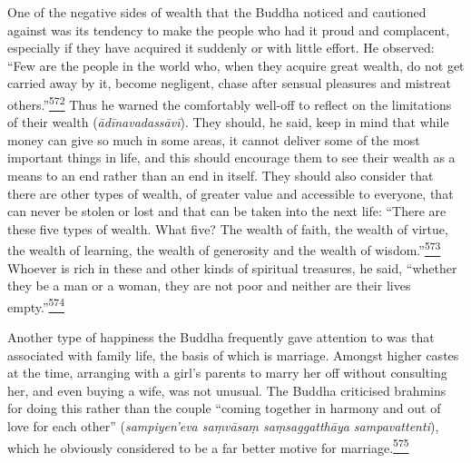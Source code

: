 One of the negative sides of wealth that the Buddha noticed and
cautioned against was its tendency to make the people who had it proud
and complacent, especially if they have acquired it suddenly or with
little effort. He observed: ``Few are the people in the world who, when
they acquire great wealth, do not get carried away by it, become
negligent, chase after sensual pleasures and mistreat
others.''\label{footprints_split_015.html_fnref572}\hyperref[footprints_split_025.htmlux5cux23fn572]{\textsuperscript{572}}
Thus he warned the comfortably well-off to reflect on the limitations of
their wealth (\emph{ādīnavadassāvī}). They should, he said, keep in mind
that while money can give so much in some areas, it cannot deliver some
of the most important things in life, and this should encourage them to
see their wealth as a means to an end rather than an end in itself. They
should also consider that there are other types of wealth, of greater
value and accessible to everyone, that can never be stolen or lost and
that can be taken into the next life: ``There are these five types of
wealth. What five? The wealth of faith, the wealth of virtue, the wealth
of learning, the wealth of generosity and the wealth of
wisdom.''\label{footprints_split_015.html_fnref573}\hyperref[footprints_split_025.htmlux5cux23fn573]{\textsuperscript{573}}
Whoever is rich in these and other kinds of spiritual treasures, he
said, ``whether they be a man or a woman, they are not poor and neither
are their lives
empty.''\label{footprints_split_015.html_fnref574}\hyperref[footprints_split_025.htmlux5cux23fn574]{\textsuperscript{574}}

Another type of happiness the Buddha frequently gave attention to was
that associated with family life, the basis of which is marriage.
Amongst higher castes at the time, arranging with a girl's parents to
marry her off without consulting her, and even buying a wife, was not
unusual. The Buddha criticised brahmins for doing this rather than the
couple ``coming together in harmony and out of love for each other''
(\emph{sampiyen'eva saṃvāsaṃ saṃsaggatthāya sampavattenti}), which he
obviously considered to be a far better motive for
marriage.\label{footprints_split_015.html_fnref575}\hyperref[footprints_split_025.htmlux5cux23fn575]{\textsuperscript{575}}


